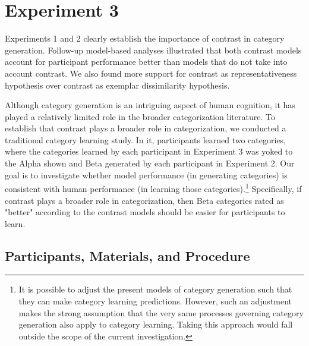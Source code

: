 

% 
\section{Experiment 3}

Experiments 1 and 2 clearly establish the importance of contrast in category
generation. Follow-up model-based analyses illustrated that both contrast models
account for participant performance better than models that do not take into
account contrast. We also found more support for contrast as representativeness
hypothesis over contrast as exemplar dissimilarity hypothesis.


Although category generation is an intriguing aspect of human cognition, it has
played a relatively limited role in the broader categorization literature. To
establish that contrast plays a broader role in categorization, we conducted a
traditional category learning study. In it, participants learned two categories,
where the categories learned by each participant in Experiment 3 was yoked to
the Alpha shown and Beta generated by each participant in Experiment 2. Our goal
is to investigate whether model performance (in generating categories) is
consistent with human performance (in learning those categories).\footnote{It is
  possible to adjust the present models of category generation such that they
  can make category learning predictions. However, such an adjustment makes the
  strong assumption that the very same processes governing category generation
  also apply to category learning. Taking this approach would fall outside the
  scope of the current investigation.} Specifically, if contrast plays a
broader role in categorization, then Beta categories rated as "better" according
to the contrast models should be easier for participants to learn.

\subsection{Participants, Materials, and Procedure}

